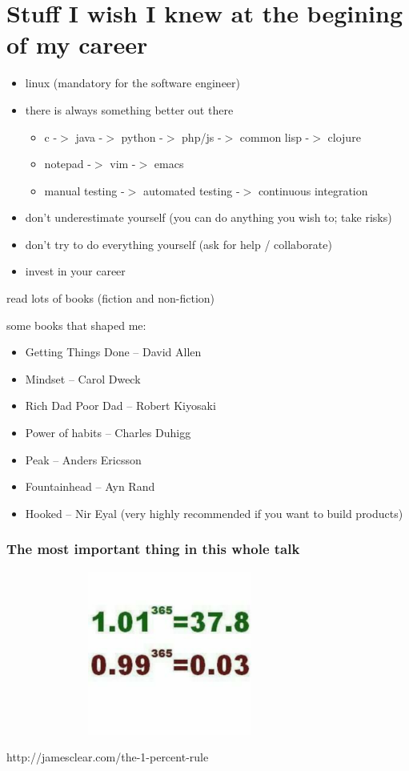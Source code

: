 \documentclass{beamer}
\begin{document}
\section{Stuff I wish I knew at the begining of my career}
\begin{frame}
  \begin{itemize}
  \item linux (mandatory for the software engineer)
  \item there is always something better out there
    \begin{itemize}
    \item c -$>$ java -$>$ python -$>$ php/js -$>$ common lisp -$>$ clojure
    \item notepad -$>$ vim -$>$ emacs
    \item manual testing -$>$ automated testing -$>$ continuous integration
    \end{itemize}
  \item don't underestimate yourself (you can do anything you wish to; take risks)
  \item don't try to do everything yourself (ask for help / collaborate)
  \item invest in your career
  \end{itemize}
\end{frame}
\begin{frame}
  read lots of books (fiction and non-fiction)

  some books that shaped me:
  \begin{itemize}
  \item Getting Things Done -- David Allen
  \item Mindset -- Carol Dweck
  \item Rich Dad Poor Dad -- Robert Kiyosaki
  \item Power of habits -- Charles Duhigg
  \item Peak -- Anders Ericsson
  \item Fountainhead -- Ayn Rand
  \item Hooked -- Nir Eyal (very highly recommended if you want to build products)
  \end{itemize}
\end{frame}
\begin{frame}
  \frametitle{The most important thing in this whole talk}
  \includegraphics[height=5.4cm,width=10.8cm]{Screenshot_2017-05-20-09-10-52-736.png}

  http://jamesclear.com/the-1-percent-rule
\end{frame}
\end{document}
